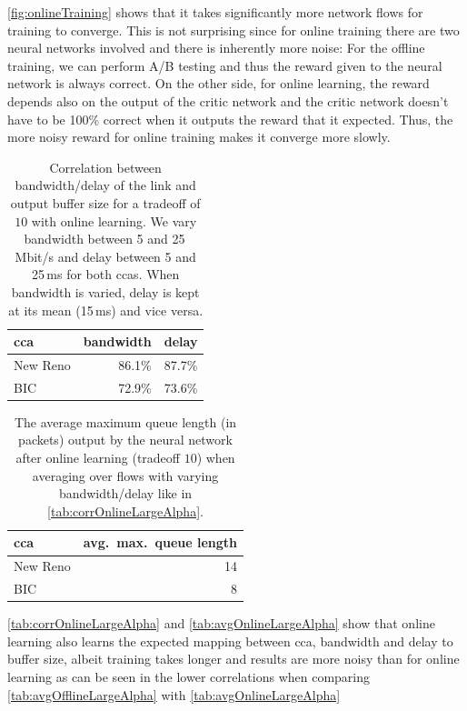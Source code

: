 \documentclass[conference]{IEEEtran}
\begin{document}
\autoref{fig:onlineTraining} shows that it takes significantly more network flows for training to converge. This is not surprising since for online training there are two neural networks involved and there is inherently more noise: For the offline training, we can perform A/B testing and thus the reward given to the neural network is always correct. On the other side, for online learning, the reward depends also on the output of the critic network and the critic network doesn't have to be 100\% correct when it outputs the reward that it expected. Thus, the more noisy reward for online training makes it converge more slowly. 

\begin{table}[h]
\caption{Correlation between bandwidth/delay of the link and output buffer size for a tradeoff of $10$ with online learning. We vary bandwidth between 5 and 25\,Mbit/s and delay between 5 and 25\,ms for both \glspl{cca}. When bandwidth is varied, delay is kept at its mean (15\,ms) and vice versa.} \label{tab:corrOnlineLargeAlpha}
\centering
\begin{tabular}{lrr} \toprule
\gls{cca} & bandwidth & delay \\ \midrule
New Reno & 86.1\% & 87.7\% \\
BIC & 72.9\% & 73.6\% \\
\bottomrule
\end{tabular}
\end{table}

\begin{table}[h]
\caption{The average maximum queue length (in packets) output by the neural network after online learning (tradeoff $10$) when averaging over flows with varying bandwidth/delay like in \autoref{tab:corrOnlineLargeAlpha}.} \label{tab:avgOnlineLargeAlpha}
\centering
\begin{tabular}{lr} \toprule
\gls{cca} & avg.~max.~queue length \\ \midrule
New Reno & 14 \\
BIC & 8 \\
\bottomrule
\end{tabular}
\end{table}

\autoref{tab:corrOnlineLargeAlpha} and \autoref{tab:avgOnlineLargeAlpha} show that online learning also learns the expected mapping between \gls{cca}, bandwidth and delay to buffer size, albeit training takes longer and results are more noisy than for online learning as can be seen in the lower correlations when comparing \autoref{tab:avgOfflineLargeAlpha} with \autoref{tab:avgOnlineLargeAlpha}
\end{document}
